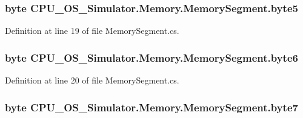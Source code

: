 \subsubsection[{byte5}]{\setlength{\rightskip}{0pt plus 5cm}byte C\+P\+U\+\_\+\+O\+S\+\_\+\+Simulator.\+Memory.\+Memory\+Segment.\+byte5\hspace{0.3cm}{\ttfamily [private]}}\label{class_c_p_u___o_s___simulator_1_1_memory_1_1_memory_segment_a6d35dbdcd3428e9a1869fda265341123}


Definition at line 19 of file Memory\+Segment.\+cs.

\hypertarget{class_c_p_u___o_s___simulator_1_1_memory_1_1_memory_segment_a242f25c3861a3c0d1d51484203ea8603}{}
\subsubsection[{byte6}]{\setlength{\rightskip}{0pt plus 5cm}byte C\+P\+U\+\_\+\+O\+S\+\_\+\+Simulator.\+Memory.\+Memory\+Segment.\+byte6\hspace{0.3cm}{\ttfamily [private]}}\label{class_c_p_u___o_s___simulator_1_1_memory_1_1_memory_segment_a242f25c3861a3c0d1d51484203ea8603}


Definition at line 20 of file Memory\+Segment.\+cs.

\hypertarget{class_c_p_u___o_s___simulator_1_1_memory_1_1_memory_segment_af4a4ab7c802e0a5b5f3684c0cfac5f80}{}
\subsubsection[{byte7}]{\setlength{\rightskip}{0pt plus 5cm}byte C\+P\+U\+\_\+\+O\+S\+\_\+\+Simulator.\+Memory.\+Memory\+Segment.\+byte7\hspace{0.3cm}{\ttfamily [private]}}\label{class_c_p_u___o_s___simulator_1_1_memory_1_1_memory_segment_af4a4ab7c802e0a5b5f3684c0cfac5f80}


